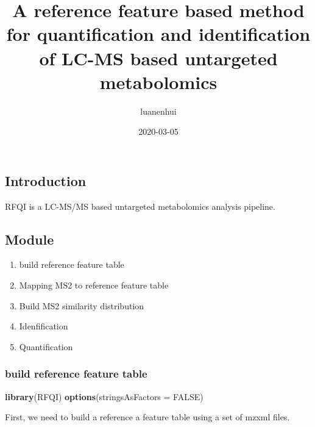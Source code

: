 \documentclass[
]{article}
\title{A reference feature based method for quantification and identification
of LC-MS based untargeted metabolomics}
\author{luanenhui}
\date{2020-03-05}
\newenvironment{Shaded}{\begin{snugshade}}{\end{snugshade}}
\newcommand{\DataTypeTok}[1]{\textcolor[rgb]{0.13,0.29,0.53}{#1}}
\newcommand{\DecValTok}[1]{\textcolor[rgb]{0.00,0.00,0.81}{#1}}
\newcommand{\FloatTok}[1]{\textcolor[rgb]{0.00,0.00,0.81}{#1}}
\newcommand{\KeywordTok}[1]{\textcolor[rgb]{0.13,0.29,0.53}{\textbf{#1}}}
\newcommand{\NormalTok}[1]{#1}
\newcommand{\OtherTok}[1]{\textcolor[rgb]{0.56,0.35,0.01}{#1}}
\newcommand{\StringTok}[1]{\textcolor[rgb]{0.31,0.60,0.02}{#1}}
\begin{document}
\maketitle

\hypertarget{introduction}{%
\subsection{Introduction}\label{introduction}}

RFQI is a LC-MS/MS based untargeted metabolomics analysis pipeline.

\hypertarget{module}{%
\subsection{Module}\label{module}}

\begin{enumerate}
\def\labelenumi{\arabic{enumi}.}
\item
  build reference feature table
\item
  Mapping MS2 to reference feature table
\item
  Build MS2 similarity distribution
\item
  Idenfification
\item
  Quantification
\end{enumerate}

\hypertarget{build-reference-feature-table}{%
\subsubsection{build reference feature
table}\label{build-reference-feature-table}}

\begin{Shaded}
\begin{Highlighting}[]
\KeywordTok{library}\NormalTok{(RFQI)}
\KeywordTok{options}\NormalTok{(}\DataTypeTok{stringsAsFactors =} \OtherTok{FALSE}\NormalTok{)}
\end{Highlighting}
\end{Shaded}

First, we need to build a reference a feature table using a set of mzxml
files.

\begin{Shaded}
\end{Shaded}
\end{document}
